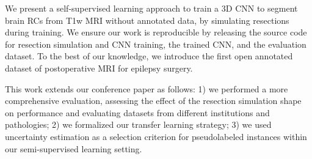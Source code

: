 We present a self-supervised learning approach to train a 3D \ac{CNN} to segment brain \acp{RC} from \ac{T1w} \ac{MRI} without annotated data, by simulating resections during training.
We ensure our work is reproducible by releasing the source code for resection simulation and \ac{CNN} training, the trained \ac{CNN}, and the evaluation dataset.
To the best of our knowledge, we introduce the first open annotated dataset of postoperative \ac{MRI} for epilepsy surgery.

This work extends our conference paper \cite{perez-garcia_simulation_2020} as follows:
1) we performed a more comprehensive evaluation, assessing the effect of the resection simulation shape on performance and evaluating datasets from different institutions and pathologies;
2) we formalized our transfer learning strategy;
3) we used uncertainty estimation as a selection criterion for pseudolabeled instances within our semi-supervised learning setting.  %
